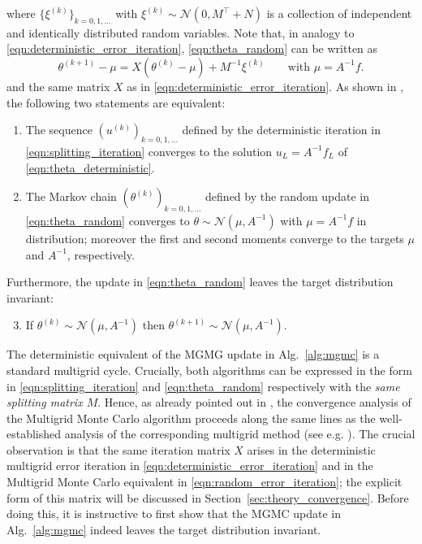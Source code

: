\documentclass[11pt,english]{article}
\theoremstyle{plain}
\theoremstyle{plain}
\theoremstyle{plain}
\theoremstyle{plain}
\numberwithin{equation}{section}
\begin{document}
where $\{\xi^{(k)}\}_{k=0,1,\dots}$ with $\xi^{(k)}\sim\mathcal{N}(0,M^{\top}+N)$ is a collection of independent and identically distributed random variables. Note that, in analogy to \eqref{eqn:deterministic_error_iteration}, \eqref{eqn:theta_random} can be written as
\begin{equation}
	\theta^{(k+1)}-\mu=X(\theta^{(k)}-\mu)+M^{-1}\xi^{(k)}\qquad\text{with $\mu=A^{-1}f$}.
	\label{eqn:random_error_iteration}
\end{equation}
and the same matrix $X$ as in \eqref{eqn:deterministic_error_iteration}. As shown in \cite{Fox.C_Parker_2017_AcceleratedGibbsSampling}, the following two statements are equivalent:
\begin{enumerate}
	\item The sequence $(u^{(k)})_{k=0,1,\dots}$ defined by the deterministic iteration in \eqref{eqn:splitting_iteration} converges to the solution $u_{L}=A^{-1}f_{L}$ of \eqref{eqn:theta_deterministic}.
	\item The Markov chain $(\theta^{(k)})_{k=0,1,\dots}$ defined by the random update in \eqref{eqn:theta_random} converges to $\theta\sim\mathcal{N}(\mu,A^{-1})$ with $\mu=A^{-1}f$ in distribution; moreover the first and second moments converge to the targets $\mu$ and $A^{-1}$, respectively.
\end{enumerate}
Furthermore, the update in \eqref{eqn:theta_random} leaves the target distribution invariant:
\begin{enumerate}
	\setcounter{enumi}{2}
	\item If $\theta^{(k)}\sim \mathcal{N}(\mu,A^{-1})$ then $\theta^{(k+1)}\sim \mathcal{N}(\mu,A^{-1})$.
\end{enumerate}
The deterministic equivalent of the MGMG update in Alg.~\ref{alg:mgmc} is a standard multigrid cycle. Crucially, both algorithms can be expressed in the form in \eqref{eqn:splitting_iteration} and \eqref{eqn:theta_random} respectively with the \textit{same splitting matrix $M$}. Hence, as already pointed out in \cite{goodman1989multigrid}, the convergence analysis of the Multigrid Monte Carlo algorithm proceeds along the same lines as the well-established analysis of the corresponding multigrid method (see e.g. \cite{Hackbusch.W_1985_MultiGridMethodsApplications,Hackbusch.W_2016_IterativeSolutionLarge}). The crucial observation is that the same iteration matrix $X$ arises in the deterministic multigrid error iteration in \eqref{eqn:deterministic_error_iteration} and in the Multigrid Monte Carlo equivalent in \eqref{eqn:random_error_iteration}; the explicit form of this matrix will be discussed in Section~\ref{sec:theory_convergence}. Before doing this, it is instructive to first show that the MGMC update in Alg.~\ref{alg:mgmc} indeed leaves the target distribution invariant.
\end{document}
